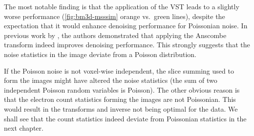 The most notable finding is that the application of the \gls{VST} leads to a slightly worse performance (\cref{fig:bm3d-msssim} orange vs.\ green lines), despite the expectation that it would enhance denoising performance for Poissonian noise. In previous work by \citeauthor{makitaloOptimalInversionAnscombe2011}, the authors demonstrated that applying the Anscombe transform indeed improves denoising performance. This strongly suggests that the noise statistics in the image deviate from a Poisson distribution. 

If the Poisson noise is not voxel-wise independent, the slice summing used to form the images might have altered the noise statistics (the sum of two independent Poisson random variables is Poisson). The other obvious reason is that the electron count statistics forming the images are not Poissonian. This would result in the transforms and inverse not being optimal for the data. We shall see that the count statistics indeed deviate from Poissonian statistics in the next chapter.

